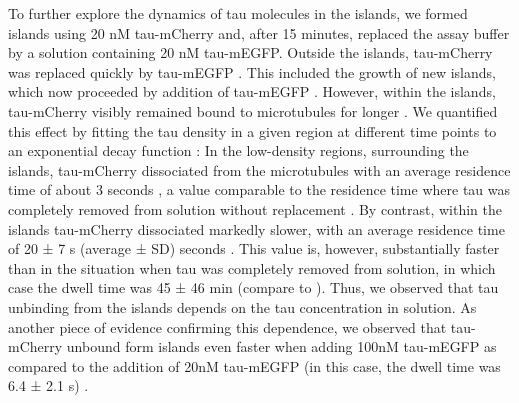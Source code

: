 To further explore the dynamics of tau molecules in the islands, we formed islands using 20 nM tau-mCherry and, after 15 minutes, replaced the assay buffer by a solution containing 20 nM tau-mEGFP. Outside the islands, tau-mCherry was replaced quickly by tau-mEGFP . This included the growth of new islands, which now proceeded by addition of tau-mEGFP . However, within the islands, tau-mCherry visibly remained bound to microtubules for longer . We quantified this effect by fitting the tau density in a given region at different time points to an exponential decay function : In the low-density regions, surrounding the islands, tau-mCherry dissociated from the microtubules with an average residence time of about 3 seconds , a value comparable to the residence time where tau was completely removed from solution without replacement . By contrast, within the islands tau-mCherry dissociated markedly slower, with an average residence time of 20 ± 7 s (average ± SD) seconds . This value is, however, substantially faster than in the situation when tau was completely removed from solution, in which case the dwell time was 45 ± 46 min (compare to ). Thus, we observed that tau unbinding from the islands depends on the tau concentration in solution. As another piece of evidence confirming this dependence, we observed that tau-mCherry unbound form islands even faster when adding 100nM tau-mEGFP as compared to the addition of 20nM tau-mEGFP (in this case, the dwell time was 6.4 ± 2.1 s) .\par

